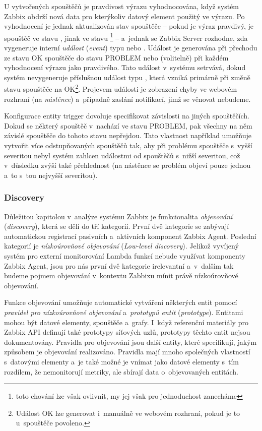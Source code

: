 \documentclass[czech, ing, kiv, he, iso690]{fasthesis}
\begin{document}
U vytvořených spouštěčů je pravdivost výrazu vyhodnocována, když systém Zabbix obdrží nová data pro kterýkoliv datový element použitý ve výrazu. Po vyhodnocení je jednak aktualizován stav spouštěče -- pokud je výraz pravdivý, je spouštěč ve stavu , jinak ve stavu \footnote{toto chování lze však ovlivnit, my jej však pro jednoduchost zanecháme} -- a~jednak se Zabbix Server rozhodne, zda vygeneruje interní \emph{událost} (\emph{event}) typu  nebo . Událost  je generována při přechodu ze stavu OK spouštěče do stavu PROBLEM nebo (volitelně) při každém vyhodnocení výrazu jako pravdivého. Tato událost v~systému setrvává, dokud systém nevygeneruje příslušnou událost typu , která vzniká primárně při změně stavu spouštěče na OK\footnote{Událost OK lze generovat i~manuálně ve webovém rozhraní, pokud je to u~spouštěče povoleno.}. Projevem události  je zobrazení chyby ve webovém rozhraní (na \emph{nástěnce}) a~případně zaslání notifikací, jimž se věnovat nebudeme.

Konfigurace entity trigger dovoluje specifikovat závislosti na jiných spouštěčích. Dokud se některý spouštěč v~nachází ve stavu PROBLEM, pak všechny na něm závislé spouštěče do tohoto stavu nepřejdou. Tato vlastnost například umožňuje vytvořit více odstupňovaných spouštěčů tak, aby při problému spouštěče s~vyšší severitou nebyl systém zahlcen událostmi od spouštěčů s~nižší severitou, což v~důsledku zvýší také přehlednost (na nástěnce se problém objeví pouze jednou a~to s~tou nejvyšší severitou).


\subsubsection{Discovery}

Důležitou kapitolou v~analýze systému Zabbix je funkcionalita \emph{objevování} (\emph{discovery}), která se dělí do tří kategorií. První dvě kategorie se zabývají automatickou registrací pasivních a~aktivních komponent Zabbix Agent. Poslední kategorií je \emph{nízkoúrovňové objevování} (\emph{Low-level discovery}). Jelikož vyvíjený systém pro externí monitorování Lambda funkcí nebude využívat komponenty Zabbix Agent, jsou pro nás první dvě kategorie irelevantní a~v~dalším tak budeme pojmem objevování v~kontextu Zabbixu mínit právě nízkoúrovňové objevování.

Funkce objevování umožňuje automatické vytváření některých entit pomocí \emph{pravidel pro nízkoúrovňové objevování} a~\emph{prototypů entit} (\emph{prototype}). Entitami mohou být datové elementy, spouštěče a~grafy. I~když referenční materiály pro Zabbix API definují také prototypy síťových uzlů, prototypy těchto entit nejsou dokumentovány. Pravidla pro objevování jsou další entity, které specifikují, jakým způsobem je objevování realizováno. Pravidla mají mnoho společných vlastností s~datovými elementy a~je také možné je vnímat jako datové elementy s~tím rozdílem, že nemonitorují metriky, ale sbírají data o~objevovaných entitách.
\end{document}
